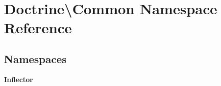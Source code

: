 \section{Doctrine\textbackslash{}Common Namespace Reference}
\label{namespace_doctrine_1_1_common}
\subsection*{Namespaces}
\begin{DoxyCompactItemize}
\item 
 {\bf Inflector}
\end{DoxyCompactItemize}
